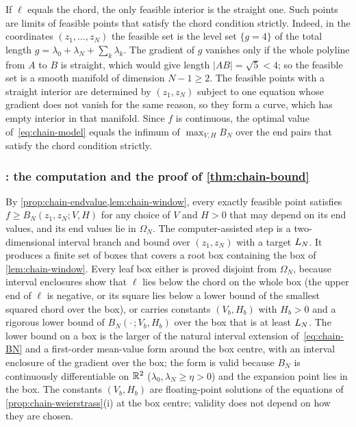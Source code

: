 \begin{remark}\label{rem:chain-boundary}
If $\ell$ equals the chord, the only feasible interior is the straight one.
Such points are limits of feasible points that satisfy the chord condition strictly.
Indeed, in the coordinates $(z_1,\dots,z_N)$ the feasible set is the level set $\{g = 4\}$ of the total length $g = \lambda_0 + \lambda_N + \sum_k\lambda_k$.
The gradient of $g$ vanishes only if the whole polyline from $A$ to $B$ is straight, which would give length $|AB| = \sqrt5 < 4$; so the feasible set is a smooth manifold of dimension $N - 1 \ge 2$.
The feasible points with a straight interior are determined by $(z_1, z_N)$ subject to one equation whose gradient does not vanish for the same reason, so they form a curve, which has empty interior in that manifold.
Since $f$ is continuous, the optimal value of~\eqref{eq:chain-model} equals the infimum of $\max_{V,H} B_N$ over the end pairs that satisfy the chord condition strictly.
\end{remark}

\subsubsection{\texorpdfstring{}{chain}: the computation and the proof of \texorpdfstring{\cref{thm:chain-bound}}{the theorem}}\label{app:chain-bnb}

By \cref{prop:chain-endvalue,lem:chain-window}, every exactly feasible point satisfies $f \ge B_N(z_1, z_N; V, H)$ for any choice of $V$ and $H > 0$ that may depend on its end values, and its end values lie in $\Omega_N$.
The computer-assisted step is a two-dimensional interval branch and bound over $(z_1, z_N)$ with a target $L_N$.
It produces a finite set of boxes that covers a root box containing the box of \cref{lem:chain-window}.
Every leaf box either is proved disjoint from $\Omega_N$, because interval enclosures show that $\ell$ lies below the chord on the whole box (the upper end of $\ell$ is negative, or its square lies below a lower bound of the smallest squared chord over the box), or carries constants $(V_b, H_b)$ with $H_b > 0$ and a rigorous lower bound of $B_N(\cdot\,; V_b, H_b)$ over the box that is at least $L_N$.
The lower bound on a box is the larger of the natural interval extension of~\eqref{eq:chain-BN} and a first-order mean-value form around the box centre, with an interval enclosure of the gradient over the box; the form is valid because $B_N$ is continuously differentiable on $\mathbb{R}^2$ ($\lambda_0, \lambda_N \ge \eta > 0$) and the expansion point lies in the box.
The constants $(V_b, H_b)$ are floating-point solutions of the equations of \cref{prop:chain-weierstrass}(i) at the box centre; validity does not depend on how they are chosen.


